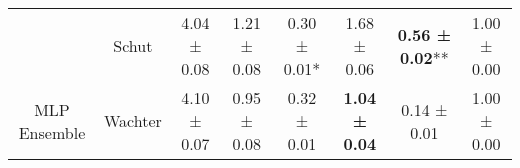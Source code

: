 \begin{table}
{\begin{tabular}[t]{cccccccc}
 & Schut & 4.04 ± 0.08\hphantom{*}\hphantom{*} & 1.21 ± 0.08\hphantom{*}\hphantom{*} & 0.30 ± 0.01*\hphantom{*} & 1.68 ± 0.06\hphantom{*}\hphantom{*} & \textbf{0.56 ± 0.02}** & 1.00 ± 0.00\hphantom{*}\hphantom{*}\\

\multirow[t]{-7}{*}{\centering\arraybackslash MLP Ensemble} & Wachter & 4.10 ± 0.07\hphantom{*}\hphantom{*} & 0.95 ± 0.08\hphantom{*}\hphantom{*} & 0.32 ± 0.01\hphantom{*}\hphantom{*} & \textbf{1.04 ± 0.04}\hphantom{*}\hphantom{*} & 0.14 ± 0.01\hphantom{*}\hphantom{*} & 1.00 ± 0.00\hphantom{*}\hphantom{*}\\
\bottomrule
\end{tabular}}
\end{table}
